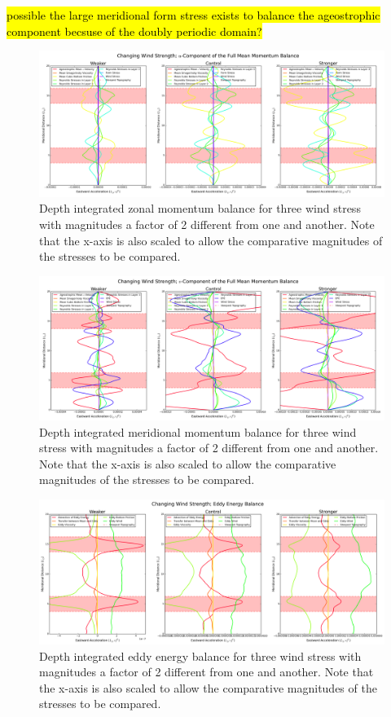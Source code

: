 \documentclass[12pt,a4paper]{report}
\begin{document}
 \hl{possible the large meridional form stress exists to balance the ageostrophic component
 	becsuse of the doubly periodic domain?}
 	
 	\begin{figure}
 		\centering
 		\includegraphics[width=\linewidth]{umom_1_4}
 		\caption{ Depth integrated zonal momentum balance for three wind
 			stress with magnitudes a factor of 2 different from one and another.
 			Note that the x-axis is also scaled to allow the comparative magnitudes
 			of the stresses to be compared.}
 		\label{fig:umombalancewindstrength}
 	\end{figure}
 	
 	\begin{figure}
 		\centering
 		\includegraphics[width=\linewidth]{vmom_1_4}
 		\caption{ Depth integrated meridional momentum balance for three wind
 			stress with magnitudes a factor of 2 different from one and another.
 			Note that the x-axis is also scaled to allow the comparative magnitudes
 			of the stresses to be compared.}
 		\label{fig:vmombalancewindstrength}
 	\end{figure}
 	
 	\begin{figure}
 		\centering
 		\includegraphics[width=\linewidth]{energybal_1_4}
 		\caption{ Depth integrated eddy energy balance for three wind
 			stress with magnitudes a factor of 2 different from one and another.
 			Note that the x-axis is also scaled to allow the comparative magnitudes
 			of the stresses to be compared.}
 		\label{fig:energybalancewindstrength}
 	\end{figure} 
 	
\end{document}
